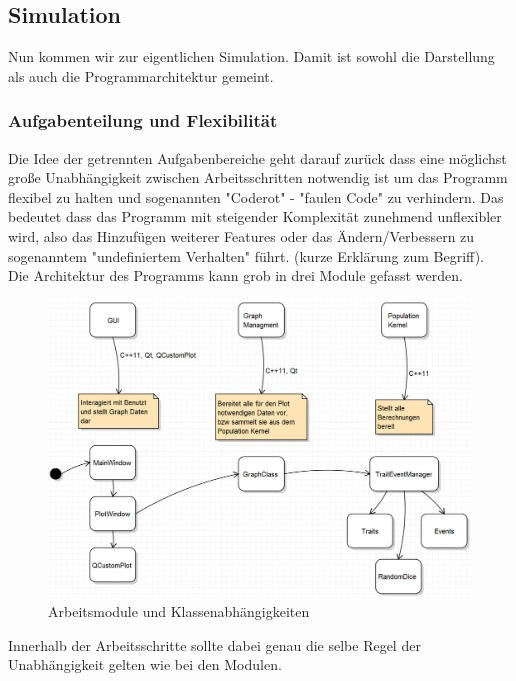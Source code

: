 \documentclass{article}
\begin{document}
	
	\subsection{Simulation}
	Nun kommen wir zur eigentlichen Simulation. Damit ist sowohl die Darstellung als auch die Programmarchitektur gemeint. 
		\subsubsection{Aufgabenteilung und Flexibilität}
		Die Idee der getrennten Aufgabenbereiche geht darauf zurück dass eine möglichst große Unabhängigkeit zwischen Arbeitsschritten notwendig ist um das Programm flexibel zu halten und sogenannten "{}Coderot"{} - "{}faulen Code"{} zu verhindern. Das bedeutet dass das Programm mit steigender Komplexität zunehmend unflexibler wird, also das Hinzufügen weiterer Features oder das Ändern/Verbessern zu sogenanntem "{}undefiniertem Verhalten"{} führt. (kurze Erklärung zum Begriff).\\
		Die Architektur des Programms kann grob in drei Module gefasst werden. 
		\begin{figure}[H]
			\centering
			\includegraphics[width=0.7\linewidth]{./Pictures/Bild_Module}
			\caption[Module]{Arbeitsmodule und Klassenabhängigkeiten}
			\label{Module und Klassen}
		\end{figure}
		Innerhalb der Arbeitsschritte sollte dabei genau die selbe Regel der Unabhängigkeit gelten wie bei den Modulen.
		
\end{document}
